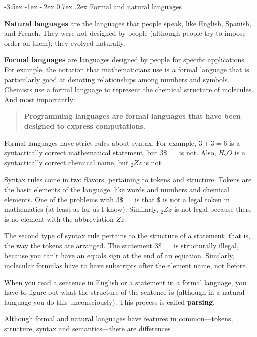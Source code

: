 \documentclass{book}
\makeatletter
\renewcommand{\section}{\@startsection 
    {section} {1} {0mm}%
    {-3.5ex \@plus -1ex \@minus -.2ex}%
    {0.7ex \@plus.2ex}%
    {\normalfont\Large\bfseries}}
\makeatother
\begin{document}
\section{Formal and natural languages}

{\bf Natural languages} are the languages that people speak,
like English, Spanish, and French.  They were not designed
by people (although people try to impose order on them);
they evolved naturally.

{\bf Formal languages} are languages designed by people for
specific applications.  For example, the notation that mathematicians
use is a formal language that is particularly good at denoting
relationships among numbers and symbols.  Chemists use a formal
language to represent the chemical structure of molecules.  And
most importantly:

\begin{quote}
{\bf Programming languages are formal languages that have been
designed to express computations.}
\end{quote}

Formal languages have strict rules
about syntax.  For example, $3+3=6$ is a syntactically correct
mathematical statement, but $3 \$ =$ is not.  Also, $H_2O$ is a
syntactically correct chemical name, but $_2Zz$ is not.

Syntax rules come in two flavors, pertaining to tokens and structure.
Tokens are the basic elements of the language, like words and numbers
and chemical elements.  One of the problems with $3 \$ =$ is that
$\$$ is not a legal token in mathematics (at least as far as I
know).  Similarly, $_2Zz$ is not legal because there is no element with
the abbreviation $Zz$.

The second type of syntax rule pertains to the structure of a
statement; that is, the way the tokens are arranged.  The statement
$3 \$ =$ is structurally illegal, because you can't have an equals
sign at the end of an equation.  Similarly, molecular formulas
have to have subscripts after the element name, not before.

When you read a sentence in English or a statement in a formal
language, you have to figure out what the structure of the sentence is
(although in a natural language you do this unconsciously).  This
process is called {\bf parsing}.


Although formal and natural languages have features in
common---tokens, structure, syntax and semantics---there are
differences.
\end{document}
